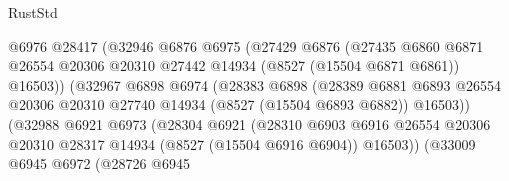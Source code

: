 \begin{lexlean}{RustStd}
\begin{coremodule}
                                    @6976
                                    @28417
                                    (@32946
                                      @6876
                                      @6975
                                      (@27429
                                        @6876
                                        (@27435
                                          @6860
                                          @6871
                                          @26554
                                          @20306
                                          @20310
                                          @27442
                                          @14934
                                          (@8527 (@15504 @6871 @6861))
                                          @16503))
                                      (@32967
                                        @6898
                                        @6974
                                        (@28383
                                          @6898
                                          (@28389
                                            @6881
                                            @6893
                                            @26554
                                            @20306
                                            @20310
                                            @27740
                                            @14934
                                            (@8527 (@15504 @6893 @6882))
                                            @16503))
                                        (@32988
                                          @6921
                                          @6973
                                          (@28304
                                            @6921
                                            (@28310
                                              @6903
                                              @6916
                                              @26554
                                              @20306
                                              @20310
                                              @28317
                                              @14934
                                              (@8527 (@15504 @6916 @6904))
                                              @16503))
                                          (@33009
                                            @6945
                                            @6972
                                            (@28726
                                              @6945

\end{coremodule}
\end{lexlean}
